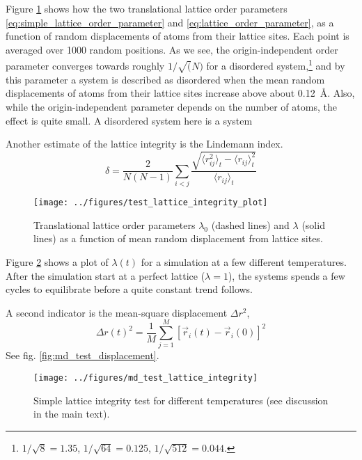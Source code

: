 \documentclass[11pt,bibliography=totoc,index=totoc]{scrbook}   %
\begin{document}
Figure \ref{fig:tlotest} shows how the two translational lattice order parameters \eqref{eq:simple_lattice_order_parameter} and \eqref{eq:lattice_order_parameter}, as a function of random displacements of atoms from their lattice sites. Each point is averaged over 1000 random positions. 
As we see, the origin-independent order parameter converges towards roughly $1/\sqrt(N)$ for a disordered system,\footnote{$1/\sqrt{8}=1.35$, $1/\sqrt{64}=0.125$, $1/\sqrt{512}=0.044$.}
and by this parameter a system is described as disordered when the mean random displacements of atoms from their lattice sites increase above about 0.12~Å.
Also, while the origin-independent parameter depends on the number of atoms, the effect is quite small.
A disordered system here is a system 

Another estimate of the lattice integrity is the Lindemann index.\cite{Lindemann:1910}
\begin{equation}
  \delta = \frac{2}{N(N-1)} \sum_{i<j} \frac{\sqrt{\langle r_{ij}^2\rangle_t - \langle r_{ij} \rangle^2_t }}{ \langle r_{ij} \rangle_t }
  \label{eq:lindemannindex}
\end{equation}

\begin{figure}[htbp]
  \begin{center}
    \texttt{[image: ../figures/test\_lattice\_integrity\_plot]}
  \end{center}
  \caption{Translational lattice order parameters $\lambda_0$ (dashed lines) and $\lambda$ (solid lines) as a function of mean random displacement from lattice sites.}
  \label{fig:tlotest}
\end{figure}

Figure \ref{fig:md_test_lattice_integrity} shows a plot of $\lambda(t)$ for a simulation at a few different temperatures. 
After the simulation start at a perfect lattice ($\lambda=1$), the systems spends a few cycles to equilibrate before a quite constant trend follows.

A second indicator is the mean-square displacement $\Delta r^2$,
\begin{equation}
  \Delta r(t)^2 = \frac{1}{M}\sum_{j=1}^M [\vec{r}_i(t)-\vec{r}_i(0)]^2
\end{equation}
See fig. \ref{fig:md_test_displacement}.

\begin{figure}[htbp]
  \begin{center}
    \texttt{[image: ../figures/md\_test\_lattice\_integrity]}
  \end{center}
  \caption{Simple lattice integrity test for different temperatures (see discussion in the main text).}
  \label{fig:md_test_lattice_integrity}
\end{figure}
\end{document}
